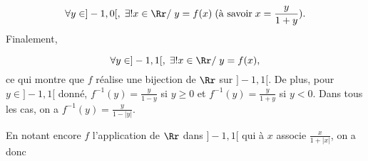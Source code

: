 {\begin{enumerate}
{$$\forall y\in]-1,0[,\;\exists!x\in\Rr/\;y=f(x)\;(\mbox{à savoir}\;x=\frac{y}{1+y}).$$
Finalement,

$$\forall y\in]-1,1[,\;\exists!x\in\Rr/\;y=f(x),$$
ce qui montre que $f$ réalise une bijection de $\Rr$ sur $]-1,1[$. De plus, pour $y\in]-1,1[$ donné,
$f^{-1}(y)=\frac{y}{1-y}$ si $y\geq0$ et $f^{-1}(y)=\frac{y}{1+y}$ si $y<0$. Dans tous les cas, on a
$f^{-1}(y)=\frac{y}{1-|y|}$.

En notant encore $f$ l'application de $\Rr$ dans $]-1,1[$ qui à $x$ associe $\frac{x}{1+|x|}$, on a donc
\begin{center}
\shadowbox{
$\forall x\in]-1,1[,\;f^{-1}(x)=\frac{x}{1-|x|}.$
}
\end{center}}
\end{enumerate}
}